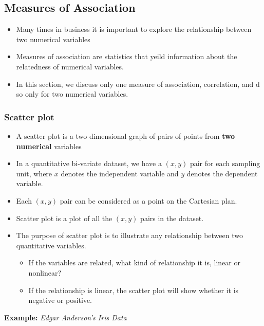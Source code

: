 \documentclass[]{book}
\providecommand{\tightlist}{%
  \setlength{\itemsep}{0pt}\setlength{\parskip}{0pt}}
\begin{document}
\hypertarget{measures-of-association}{%
\subsection{Measures of Association}\label{measures-of-association}}

\begin{itemize}
\tightlist
\item
  Many times in business it is important to explore the relationship between two numerical variables
\item
  Measures of association are statistics that yeild information about the relatedness of numerical variables.
\item
  In this section, we discuss only one measure of association, correlation, and d so only for two numerical variables.
\end{itemize}

\hypertarget{scatter-plot}{%
\subsubsection{Scatter plot}\label{scatter-plot}}

\begin{itemize}
\tightlist
\item
  A scatter plot is a two dimensional graph of pairs of points from \textbf{two numerical} variables
\item
  In a quantitative bi-variate dataset, we have a \((x,y)\) pair for each sampling unit, where \(x\) denotes the independent variable and \(y\) denotes the dependent variable.
\item
  Each \((x,y)\) pair can be considered as a point on the Cartesian plan.
\item
  Scatter plot is a plot of all the \((x,y)\) pairs in the dataset.
\item
  The purpose of scatter plot is to illustrate any relationship between two quantitative variables.

  \begin{itemize}
  \tightlist
  \item
    If the variables are related, what kind of relationship it is, linear or nonlinear?
  \item
    If the relationship is linear, the scatter plot will show whether it is negative or positive.
  \end{itemize}
\end{itemize}

\textbf{Example:} \emph{Edgar Anderson's Iris Data}
\end{document}
